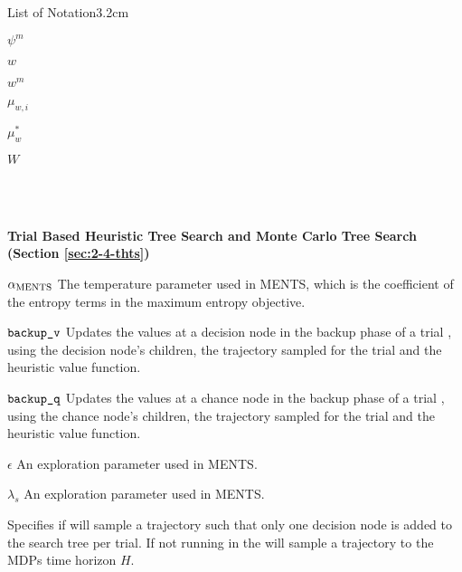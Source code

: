 \begin{mclistof}{List of Notation}{3.2cm}
    \item[$\psi^m$] 
    \item[$w$] 
    \item[$w^m$] 
    \item[$\mu_{w,i}$] 
    \item[$\mu_{w}^*$] 
    \item[$W$] 
    \item[$ $] 
    \item[$ $] 
    \item[$ $] 
    \item[$ $] 
    \\
    \item[{\parbox[t]{\textwidth}{\Large\textbf{Trial Based Heuristic Tree Search and Monte Carlo Tree Search (Section \ref{sec:2-4-thts})}\hfill\hfill}}]
    \item[$\alpha_{{\textnormal{MENTS}}}$] 
        The temperature parameter used in MENTS, which is the coefficient of the entropy terms in the maximum entropy objective.
    \item[${\textnormal{\texttt{backup\_v}}}$]
        Updates the values at a decision node in the backup phase of a trial \thtspp, using the decision node's children, the trajectory sampled for the trial and the heuristic value function.
    \item[${\textnormal{\texttt{backup\_q}}}$] 
        Updates the values at a chance node in the backup phase of a trial \thtspp, using the chance node's children, the trajectory sampled for the trial and the heuristic value function.
    \item[$\epsilon$]
        An exploration parameter used in MENTS.
    \item[$\lambda_s$] 
        An exploration parameter used in MENTS.
    \item[\mctsmode] 
        Specifies if \thtspp\ewe will sample a trajectory such that only one decision node is added to the search tree per trial. If not running in \mctsmode\ewe the \thtspp\ewe will sample a trajectory to the MDPs time horizon $H$.

\end{mclistof}
